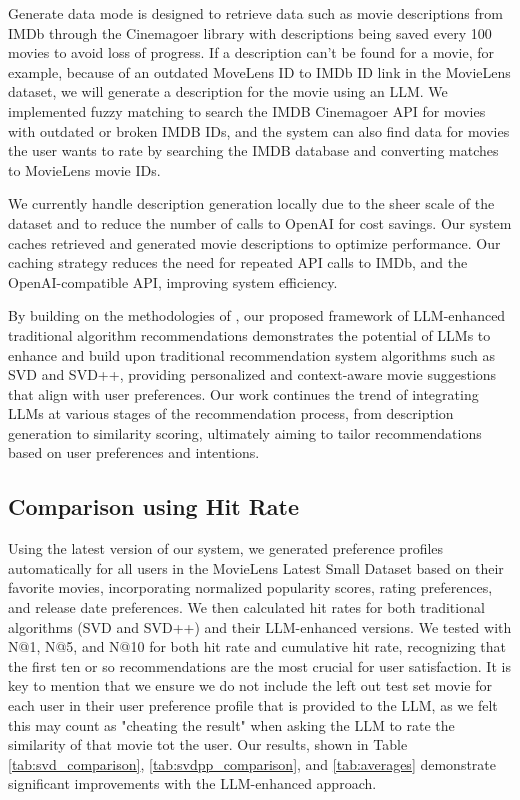 \documentclass[sigconf]{acmart}
\begin{document}
Generate data mode is designed to retrieve data such as movie descriptions from IMDb through the Cinemagoer library with descriptions being saved every 100 movies to avoid loss of progress. If a description can't be found for a movie, for example, because of an outdated MoveLens ID to IMDb ID link in the MovieLens dataset, we will generate a description for the movie using an LLM. We implemented fuzzy matching to search the IMDB Cinemagoer API for movies with outdated or broken IMDB IDs, and the system can also find data for movies the user wants to rate by searching the IMDB database and converting matches to MovieLens movie IDs.

We currently handle description generation locally due to the sheer scale of the dataset and to reduce the number of calls to OpenAI for cost savings. Our system caches retrieved and generated movie descriptions to optimize performance. Our caching strategy reduces the need for repeated API calls to IMDb, and the OpenAI-compatible API, improving system efficiency.

By building on the methodologies of \cite{AcharyaLLM2023,yousefi2024llm}, our proposed framework of LLM-enhanced traditional algorithm recommendations demonstrates the potential of LLMs to enhance and build upon traditional recommendation system algorithms such as SVD and SVD++, providing personalized and context-aware movie suggestions that align with user preferences. Our work continues the trend of integrating LLMs at various stages of the recommendation process, from description generation to similarity scoring, ultimately aiming to tailor recommendations based on user preferences and intentions.
 
\subsection{Comparison using Hit Rate}

\smallskip
\noindent
Using the latest version of our system, we generated preference profiles automatically for all users in the MovieLens Latest Small Dataset based on their favorite movies, incorporating normalized popularity scores, rating preferences, and release date preferences. We then calculated hit rates for both traditional algorithms (SVD and SVD++) and their LLM-enhanced versions. We tested with N@1, N@5, and N@10 for both hit rate and cumulative hit rate, recognizing that the first ten or so recommendations are the most crucial for user satisfaction. It is key to mention that we ensure we do not include the left out test set movie for each user in their user preference profile that is provided to the LLM, as we felt this may count as "cheating the result" when asking the LLM to rate the similarity of that movie tot the user. Our results, shown in Table \ref{tab:svd_comparison}, \ref{tab:svdpp_comparison}, and \ref{tab:averages} demonstrate significant improvements with the LLM-enhanced approach.
\end{document}
